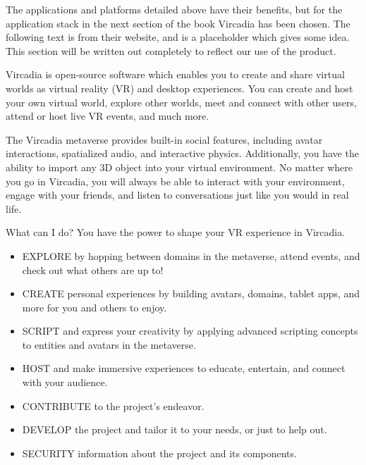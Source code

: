 The applications and platforms detailed above have their benefits, but for the application stack in the next section of the book Vircadia has been chosen. The following text is from their website, and is a placeholder which gives some idea. This section will be written out completely to reflect our use of the product.\par
Vircadia is open-source software which enables you to create and share virtual worlds as virtual reality (VR) and desktop experiences. You can create and host your own virtual world, explore other worlds, meet and connect with other users, attend or host live VR events, and much more.\par
The Vircadia metaverse provides built-in social features, including avatar interactions, spatialized audio, and interactive physics. Additionally, you have the ability to import any 3D object into your virtual environment. No matter where you go in Vircadia, you will always be able to interact with your environment, engage with your friends, and listen to conversations just like you would in real life.\par
What can I do? You have the power to shape your VR experience in Vircadia.
\begin{itemize}
\item EXPLORE by hopping between domains in the metaverse, attend events, and check out what others are up to!
\item CREATE personal experiences by building avatars, domains, tablet apps, and more for you and others to enjoy.
\item SCRIPT and express your creativity by applying advanced scripting concepts to entities and avatars in the metaverse.
\item HOST and make immersive experiences to educate, entertain, and connect with your audience.
\item CONTRIBUTE to the project's endeavor.
\item DEVELOP the project and tailor it to your needs, or just to help out.
\item SECURITY information about the project and its components.
\end{itemize}
   